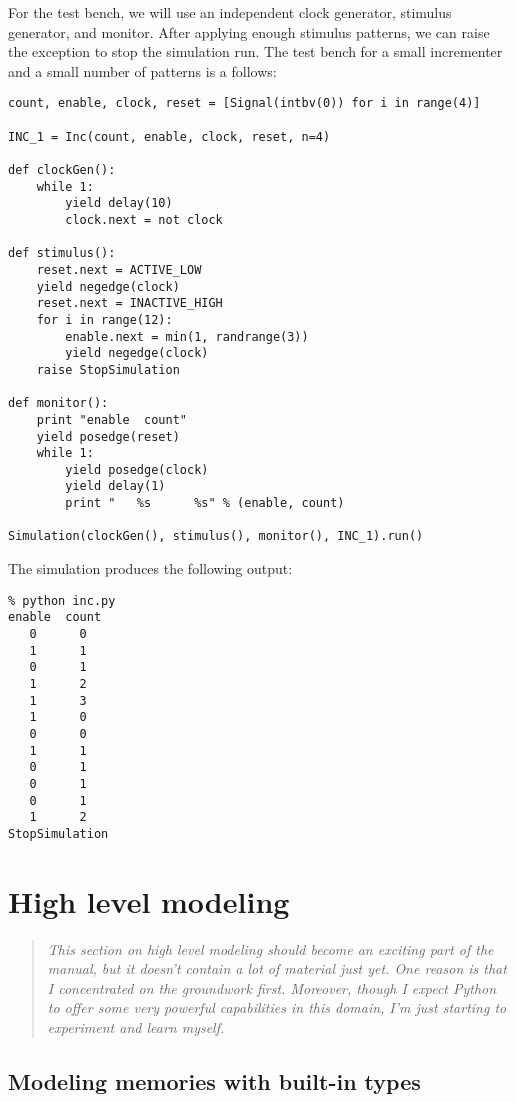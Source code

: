 For the test bench, we will use an independent clock generator, stimulus
generator, and monitor. After applying enough stimulus patterns, we
can raise the  exception to stop the
simulation run. The test bench for a small incrementer and a small
number of patterns is a follows:

\begin{verbatim}
count, enable, clock, reset = [Signal(intbv(0)) for i in range(4)]

INC_1 = Inc(count, enable, clock, reset, n=4)

def clockGen():
    while 1:
        yield delay(10)
        clock.next = not clock

def stimulus():
    reset.next = ACTIVE_LOW
    yield negedge(clock)
    reset.next = INACTIVE_HIGH
    for i in range(12):
        enable.next = min(1, randrange(3))
        yield negedge(clock)
    raise StopSimulation

def monitor():
    print "enable  count"
    yield posedge(reset)
    while 1:
        yield posedge(clock)
        yield delay(1)
        print "   %s      %s" % (enable, count)
        
Simulation(clockGen(), stimulus(), monitor(), INC_1).run()
\end{verbatim}

The simulation produces the following output:
\begin{verbatim}
% python inc.py
enable  count
   0      0
   1      1
   0      1
   1      2
   1      3
   1      0
   0      0
   1      1
   0      1
   0      1
   0      1
   1      2
StopSimulation
\end{verbatim}

\section{High level modeling \label{model-hl}}

\begin{quote}
\em 
This section on high level modeling should become an exciting part of
the manual, but it doesn't contain a lot of material just yet. One
reason is that I concentrated on the groundwork first. Moreover,
though I expect Python to offer some very powerful capabilities in
this domain, I'm just starting to experiment and learn myself. 
\end{quote}

\subsection{Modeling memories with built-in types \label{model-mem}}

